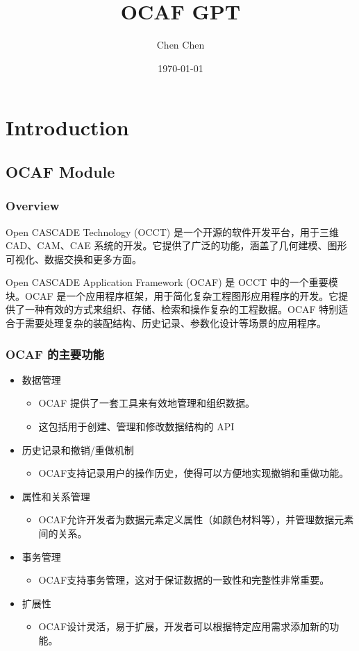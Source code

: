 \documentclass[11pt]{article}
\author{Chen Chen}
\date{\today}
\title{OCAF GPT}
\begin{document}
\maketitle
\tableofcontents

\section{Introduction}
\label{sec:org5ef4d95}

\subsection{OCAF Module}
\label{sec:orga0d6b3b}

\subsubsection{Overview}
\label{sec:org050532e}
Open CASCADE Technology (OCCT) 是一个开源的软件开发平台，用于三维 CAD、CAM、CAE 系统的开发。它提供了广泛的功能，涵盖了几何建模、图形可视化、数据交换和更多方面。

Open CASCADE Application Framework (OCAF) 是 OCCT 中的一个重要模块。OCAF 是一个应用程序框架，用于简化复杂工程图形应用程序的开发。它提供了一种有效的方式来组织、存储、检索和操作复杂的工程数据。OCAF 特别适合于需要处理复杂的装配结构、历史记录、参数化设计等场景的应用程序。
\subsubsection{OCAF 的主要功能}
\label{sec:org2a842a2}

\begin{itemize}
\item 数据管理
\begin{itemize}
\item OCAF 提供了一套工具来有效地管理和组织数据。
\item 这包括用于创建、管理和修改数据结构的 API
\end{itemize}
\item 历史记录和撤销/重做机制
\begin{itemize}
\item OCAF支持记录用户的操作历史，使得可以方便地实现撤销和重做功能。
\end{itemize}
\item 属性和关系管理
\begin{itemize}
\item OCAF允许开发者为数据元素定义属性（如颜色材料等），并管理数据元素间的关系。
\end{itemize}
\item 事务管理
\begin{itemize}
\item OCAF支持事务管理，这对于保证数据的一致性和完整性非常重要。
\end{itemize}
\item 扩展性
\begin{itemize}
\item OCAF设计灵活，易于扩展，开发者可以根据特定应用需求添加新的功能。
\end{itemize}
\end{itemize}
\end{document}
